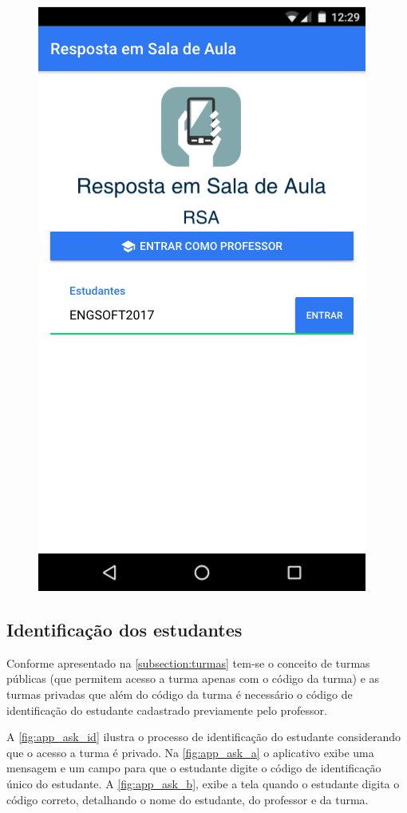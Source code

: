 \begin{figure}[ht]
{    \includegraphics[scale=.4]{imagens/telas/app_home}
  }

  \doautor
  \label{fig:app_home}
\end{figure}


\subsection{Identificação dos estudantes}

Conforme apresentado na \autoref{subsection:turmas} tem-se o conceito
de turmas públicas (que permitem acesso a turma apenas com o código da turma) e
as turmas privadas que além do código da turma é necessário o código de identificação
do estudante cadastrado previamente pelo professor.

A \autoref{fig:app_ask_id} ilustra o processo de identificação do estudante
considerando que o acesso a turma é privado. Na \autoref{fig:app_ask_a} o aplicativo
exibe uma mensagem e um campo para que o estudante digite o código de
identificação único do estudante. A \autoref{fig:app_ask_b}, exibe a tela
quando o estudante digita o código correto, detalhando o nome do estudante, do professor e da turma.


